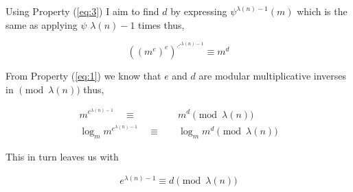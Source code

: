 Using Property (\ref{eq:3}) I aim to find $d$ by expressing $\psi^{\lambda(n)-1}(m)$ which is the same as applying $\psi$ $\lambda(n)-1$ times thus,

$$
\left( (m^{e})^{e} \right) ^{ \iddots ^{\lambda(n)-1}} \equiv m^{d}
$$

From Property (\ref{eq:1}) we know that $e$ and $d$ are modular multiplicative inverses in $\pmod{\lambda(n)}$ thus, 

\begin{align*}
m^{e^{\lambda(n)-1}} \quad \equiv \quad &m^{d} \pmod{\lambda(n)} \\
\log_{m} m^{e^{\lambda(n)-1}} \quad \equiv \quad &\log_{m} m^{d} \pmod{\lambda(n)} 
\end{align*}

This in turn leaves us with

\begin{align*}
e^{\lambda(n)-1} \equiv d \pmod{\lambda(n)} \tag{4} \label{eq:4}
\end{align*}



